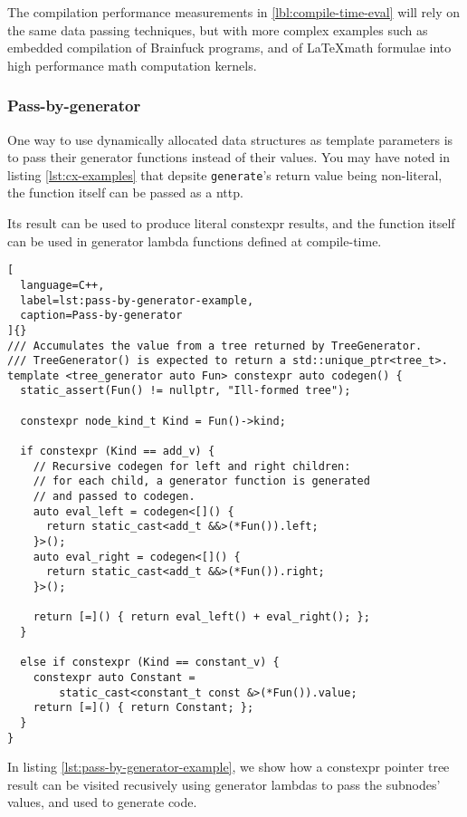 \documentclass[../main]{subfiles}
\begin{document}
The compilation performance measurements in \ref{lbl:compile-time-eval} will
rely on the same data passing techniques, but with more complex examples such
as embedded compilation of Brainfuck programs, and of \LaTeX math formulae
into high performance math computation kernels.

\subsubsection{
  Pass-by-generator
}

\label{lbl:pbg-technique}

One way to use dynamically allocated data structures as template parameters
is to pass their generator functions instead of their values.
You may have noted in listing \ref{lst:cx-examples} that depsite
\lstinline{generate}'s return value being non-literal, the function itself
can be passed as a \gls{nttp}.

Its result can be used to produce literal \gls{constexpr} results,
and the function itself can be used in generator lambda functions
defined at compile-time.

\begin{lstlisting}[
  language=C++,
  label=lst:pass-by-generator-example,
  caption=Pass-by-generator
]{}
/// Accumulates the value from a tree returned by TreeGenerator.
/// TreeGenerator() is expected to return a std::unique_ptr<tree_t>.
template <tree_generator auto Fun> constexpr auto codegen() {
  static_assert(Fun() != nullptr, "Ill-formed tree");

  constexpr node_kind_t Kind = Fun()->kind;

  if constexpr (Kind == add_v) {
    // Recursive codegen for left and right children:
    // for each child, a generator function is generated
    // and passed to codegen.
    auto eval_left = codegen<[]() {
      return static_cast<add_t &&>(*Fun()).left;
    }>();
    auto eval_right = codegen<[]() {
      return static_cast<add_t &&>(*Fun()).right;
    }>();

    return [=]() { return eval_left() + eval_right(); };
  }

  else if constexpr (Kind == constant_v) {
    constexpr auto Constant =
        static_cast<constant_t const &>(*Fun()).value;
    return [=]() { return Constant; };
  }
}
\end{lstlisting}

In listing \ref{lst:pass-by-generator-example}, we show how a \gls{constexpr}
pointer tree result can be visited recusively using generator lambdas
to pass the subnodes' values, and used to generate code.
\end{document}
